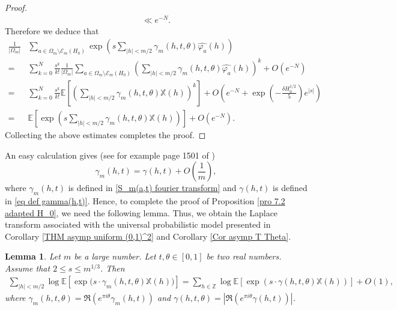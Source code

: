 \documentclass[12pt]{amsart}
\newtheorem{lem}[thm]{Lemma}
\theoremstyle{definition}
\numberwithin{equation}{section}
\numberwithin{equation}{section}
\def\E{\mathbb{E}}
\def\Ecal{\mathcal{E}}
\def\Z{\mathbb{Z}}
\def\X{\mathbb{X}}
\def\E{\mathbb{E}}
\begin{document}
\begin{proof}
\begin{align*}
\ll e^{- N}.
\end{align*}
Therefore we deduce that
\begin{align*}\frac{1}{|\Omega_m|}&
\sum_{a\in \Omega_m \setminus \Ecal_m(H_0)}
\exp
\left(
s  \sum_{|h|< m/2}
\gamma_m(h,t,\theta)\widehat{\varphi_a}(h)
\right)\\
=&
\sum_{k=0}^N
\frac{s^k}{k!}
\frac{1}{|\Omega_m|}
\sum_{a\in \Omega_m \setminus \Ecal_m(H_0)}
\left(
\sum_
{|h|< m/2}
\gamma_m(h,t,\theta)\widehat{\varphi_a}(h)
\right)^k
+ O \left(e^{-N}\right)\\
=&
\sum_{k=0}^N
\frac{s^k}{k!}
\E\left[\left(
\sum_
{|h|< m/2}
\gamma_m(h,t,\theta)\X(h)
\right)^k\right]
+ O \left(e^{-N} + \exp\left(-\frac{\delta H_0^{1/2}}{5}\right)e^{|s|}\right)\\
=& \E \left[\exp \left(s \sum_{|h|< m/2} \gamma_m(h,t,\theta)\X(h)\right) \right] + O \left(e^{- N}\right) .
\end{align*}
Collecting the above estimates completes the proof.
\end{proof}

An easy calculation gives (see for example page 1501 of \cite{KS16})
\begin{equation}\label{eq unif bound gamma p =gamma}
\gamma_m(h,t) 
= \gamma (h,t) +O\left(\frac{1}{m}\right),
\end{equation}
where $\gamma_m(h,t) $ is defined in  \eqref{S_m(a,t) fourier transform} and $\gamma(h,t) $ is defined in \eqref{eq def gamma(h,t)}.
Hence, to complete the proof of Proposition \ref{pro 7.2 adapted H_0}, we need the following lemma. Thus, we obtain the Laplace transform associated with the universal probabilistic model presented in Corollary \ref{THM asymp  uniform (0,1)^2} and Corollary \ref{Cor asymp T Theta}.





\begin{lem}\label{lem estim log E exp sum gamma_p} Let $m$ be a large number. Let $t, \theta\in [0,1]$ be two real numbers. Assume that $2\leq s \leq m^{1/3}$. Then
\begin{align*}
    \sum_{|h|< m/2} \log \E \left[\exp \Big(s \cdot \gamma_m(h,t,\theta)\X(h)\Big) \right] = 
    \sum_{h\in \Z} \log \E \left[\exp \left(s \cdot  \gamma(h,t,\theta)\X(h)\right) \right] +O(1),
\end{align*} 
where $\gamma_m(h,t,\theta) = \Re\left(e^{\pi i \theta } \gamma_m(h,t)\right) $ and $\gamma(h,t,\theta) = 
 \left| \Re\left(e^{\pi i \theta } \gamma(h,t)\right) \right| $.
\end{lem}
\end{document}
